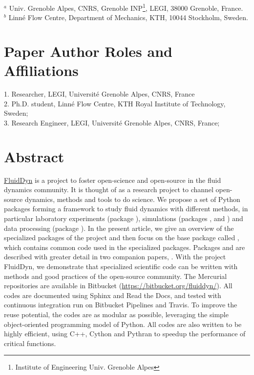 \documentclass{../jors}
\begin{document}
\smallskip

$^a$ Univ. Grenoble Alpes, CNRS, Grenoble INP\footnote{Institute of Engineering
Univ. Grenoble Alpes}, LEGI, 38000 Grenoble, France.\\
$^b$ Linn\'e Flow Centre, Department of Mechanics, KTH, 10044 Stockholm, Sweden.

\section*{Paper Author Roles and Affiliations}

1. Researcher, LEGI, Universit\'e Grenoble Alpes, CNRS, France\\
2. Ph.D. student, Linn\'e Flow Centre, KTH Royal Institute of Technology,
Sweden; \\
3. Research Engineer, LEGI, Universit\'e Grenoble Alpes, CNRS, France; \\

\section*{Abstract}


\href{http://fluiddyn.readthedocs.io}{FluidDyn} is a project to foster
open-science and open-source in the fluid dynamics community.  It is thought of as
a research project to channel open-source dynamics, methods and tools to do
science.
%
We propose a set of Python packages forming a framework to study fluid dynamics
with different methods, in particular laboratory experiments (package
), simulations (packages ,  and
) and data processing (package ).
%
In the present article, we give an overview of the specialized packages of the
project and then focus on the base package called , which contains
common code used in the specialized packages.  Packages  and
 are described with greater detail in two companion papers,
\citet{fluidfft, fluidsim}.
%
With the project FluidDyn, we demonstrate that specialized scientific code can
be written with methods and good practices of the open-source community. The
Mercurial repositories are available in Bitbucket
(\url{https://bitbucket.org/fluiddyn/}). All codes are documented using Sphinx
and Read the Docs, and tested with continuous integration run on Bitbucket
Pipelines and Travis.
%
To improve the reuse potential, the codes are as modular as possible, leveraging
the simple object-oriented programming model of Python.
%
All codes are also written to be highly efficient, using C++, Cython and
Pythran to speedup the performance of critical functions.
\end{document}
